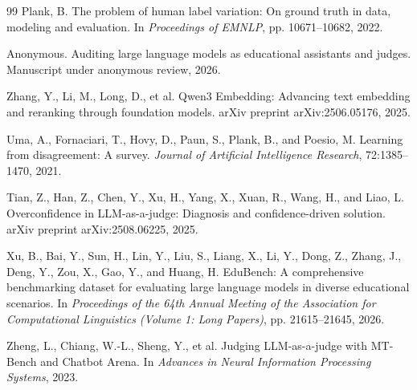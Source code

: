 \documentclass[UTF8,fontset=fandol,a4paper,11pt]{ctexart}
\begin{document}
\begin{thebibliography}{99}
Plank, B. The problem of human label variation: On ground truth in data, modeling and evaluation. In \emph{Proceedings of EMNLP}, pp. 10671--10682, 2022.

Anonymous. Auditing large language models as educational assistants and judges. Manuscript under anonymous review, 2026.

Zhang, Y., Li, M., Long, D., et al. Qwen3 Embedding: Advancing text embedding and reranking through foundation models. arXiv preprint arXiv:2506.05176, 2025.

Uma, A., Fornaciari, T., Hovy, D., Paun, S., Plank, B., and Poesio, M. Learning from disagreement: A survey. \emph{Journal of Artificial Intelligence Research}, 72:1385--1470, 2021.

Tian, Z., Han, Z., Chen, Y., Xu, H., Yang, X., Xuan, R., Wang, H., and Liao, L. Overconfidence in LLM-as-a-judge: Diagnosis and confidence-driven solution. arXiv preprint arXiv:2508.06225, 2025.

Xu, B., Bai, Y., Sun, H., Lin, Y., Liu, S., Liang, X., Li, Y., Dong, Z., Zhang, J., Deng, Y., Zou, X., Gao, Y., and Huang, H. EduBench: A comprehensive benchmarking dataset for evaluating large language models in diverse educational scenarios. In \emph{Proceedings of the 64th Annual Meeting of the Association for Computational Linguistics (Volume 1: Long Papers)}, pp. 21615--21645, 2026.

Zheng, L., Chiang, W.-L., Sheng, Y., et al. Judging LLM-as-a-judge with MT-Bench and Chatbot Arena. In \emph{Advances in Neural Information Processing Systems}, 2023.

\end{thebibliography}
\end{document}
